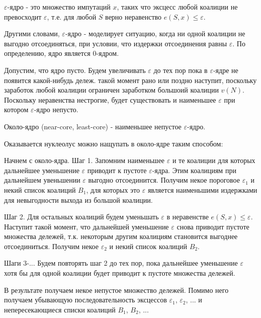 \begin{definition}
$\varepsilon$-ядро - это множество импутаций $x$, таких что эксцесс любой коалиции не превосходит $\varepsilon$, т.е. для любой $S$ верно неравенство $e(S,x)\leq \varepsilon$.
\end{definition}

Другими словами, $\varepsilon$-ядро - моделирует ситуацию, когда ни одной коалиции не выгодно отсоединяться, при условии, что издержки отсоединения равны $\varepsilon$. По определению, ядро является $0$-ядром. 

Допустим, что ядро пусто. Будем увеличивать $\varepsilon$ до тех пор пока в $\varepsilon$-ядре не появится какой-нибудь дележ. такой момент рано или поздно наступит, поскольку заработок любой коалиции ограничен заработком большоий коалиции $v(N)$. Поскольку неравенства нестрогие, будет существовать и наименьшее $\varepsilon$ при котором $\varepsilon$-ядро непусто.

\begin{definition}
Около-ядро (near-core, least-core) - наименьшее непустое $\varepsilon$-ядро.
\end{definition}

Оказывается нуклеолус можно нащупать в около-ядре таким способом:

Начнем с около-ядра. 
Шаг 1. Запомним наименьшее $\varepsilon$ и те коалиции для которых дальнейшее уменьшение $\varepsilon$ приводит к пустоте $\varepsilon$-ядра. Этим коалициям при дальнейшем увеньшении $\varepsilon$ выгодно отсоединится.
Получим некое пороговое $\varepsilon_{1}$ и некий список коалиций $B_{1}$, для которых это $\varepsilon$ является наименьшими издержками для невыгодности выхода из большой коалиции.

Шаг 2. Для остальных коалиций будем уменьшать $\varepsilon$ в неравенстве $e(S,x)\leq \varepsilon$. Наступит такой момент, что дальнейшей уменьшение $\varepsilon$ снова приводит пустоте множества дележей, т.к. некоторым другим коалициям становится выгоднее отсоединиться.
Получим некое $\varepsilon_{2}$ и некий список коалиций $B_{2}$.

Шаги 3-... Будем повторять шаг 2 до тех пор, пока дальнейшее уменьшение $\varepsilon$ хотя бы для одной коалиции будет приводит к пустоте множества дележей.

В результате получаем некое непустое множество дележей. Помимо него получаем убывающую последовательность эксцессов $\varepsilon_{1}$, $\varepsilon_{2}$, ... и непересекающиеся списки коалиций $B_{1}$, $B_{2}$, ... 

